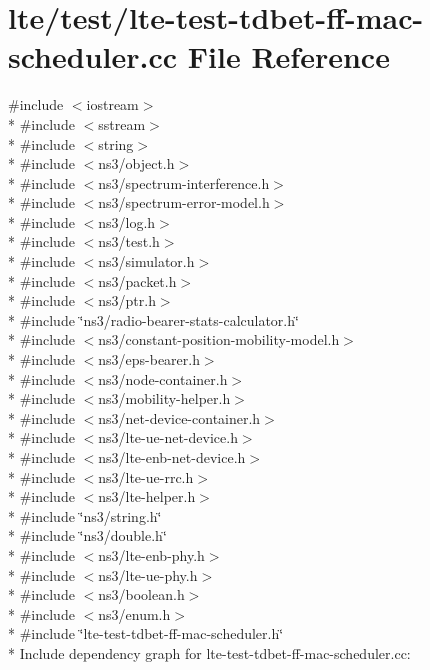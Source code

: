 \hypertarget{lte-test-tdbet-ff-mac-scheduler_8cc}{}\section{lte/test/lte-\/test-\/tdbet-\/ff-\/mac-\/scheduler.cc File Reference}
\label{lte-test-tdbet-ff-mac-scheduler_8cc}
{\ttfamily \#include $<$iostream$>$}\\*
{\ttfamily \#include $<$sstream$>$}\\*
{\ttfamily \#include $<$string$>$}\\*
{\ttfamily \#include $<$ns3/object.\+h$>$}\\*
{\ttfamily \#include $<$ns3/spectrum-\/interference.\+h$>$}\\*
{\ttfamily \#include $<$ns3/spectrum-\/error-\/model.\+h$>$}\\*
{\ttfamily \#include $<$ns3/log.\+h$>$}\\*
{\ttfamily \#include $<$ns3/test.\+h$>$}\\*
{\ttfamily \#include $<$ns3/simulator.\+h$>$}\\*
{\ttfamily \#include $<$ns3/packet.\+h$>$}\\*
{\ttfamily \#include $<$ns3/ptr.\+h$>$}\\*
{\ttfamily \#include \char`\"{}ns3/radio-\/bearer-\/stats-\/calculator.\+h\char`\"{}}\\*
{\ttfamily \#include $<$ns3/constant-\/position-\/mobility-\/model.\+h$>$}\\*
{\ttfamily \#include $<$ns3/eps-\/bearer.\+h$>$}\\*
{\ttfamily \#include $<$ns3/node-\/container.\+h$>$}\\*
{\ttfamily \#include $<$ns3/mobility-\/helper.\+h$>$}\\*
{\ttfamily \#include $<$ns3/net-\/device-\/container.\+h$>$}\\*
{\ttfamily \#include $<$ns3/lte-\/ue-\/net-\/device.\+h$>$}\\*
{\ttfamily \#include $<$ns3/lte-\/enb-\/net-\/device.\+h$>$}\\*
{\ttfamily \#include $<$ns3/lte-\/ue-\/rrc.\+h$>$}\\*
{\ttfamily \#include $<$ns3/lte-\/helper.\+h$>$}\\*
{\ttfamily \#include \char`\"{}ns3/string.\+h\char`\"{}}\\*
{\ttfamily \#include \char`\"{}ns3/double.\+h\char`\"{}}\\*
{\ttfamily \#include $<$ns3/lte-\/enb-\/phy.\+h$>$}\\*
{\ttfamily \#include $<$ns3/lte-\/ue-\/phy.\+h$>$}\\*
{\ttfamily \#include $<$ns3/boolean.\+h$>$}\\*
{\ttfamily \#include $<$ns3/enum.\+h$>$}\\*
{\ttfamily \#include \char`\"{}lte-\/test-\/tdbet-\/ff-\/mac-\/scheduler.\+h\char`\"{}}\\*
Include dependency graph for lte-\/test-\/tdbet-\/ff-\/mac-\/scheduler.cc\+:
